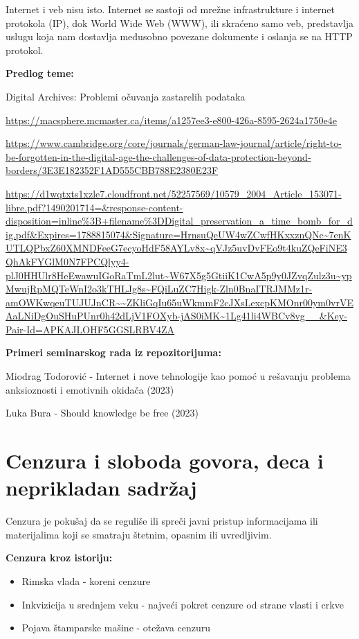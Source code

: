 \documentclass{article}
\begin{document}
Internet i veb nisu isto. Internet se sastoji od mrežne infrastrukture i internet protokola (IP), dok World Wide Web (WWW), ili skraćeno samo veb, predstavlja uslugu koja nam dostavlja međusobno povezane dokumente i oslanja se na HTTP protokol.

\textbf{Predlog teme:}

Digital Archives: Problemi očuvanja zastarelih podataka

\url{https://macsphere.mcmaster.ca/items/a1257ee3-e800-426a-8595-2624a1750e4e}

\url{https://www.cambridge.org/core/journals/german-law-journal/article/right-to-be-forgotten-in-the-digital-age-the-challenges-of-data-protection-beyond-borders/3E3E182352F1AD555CBB788E2380E23F}

\url{https://d1wqtxts1xzle7.cloudfront.net/52257569/10579_2004_Article_153071-libre.pdf?1490201714=&response-content-disposition=inline%3B+filename%3DDigital_preservation_a_time_bomb_for_dig.pdf&Expires=1788815074&Signature=HrnsuQeUW4wZCwfHKxxznQNc~7enKUTLQPbxZ60XMNDFeeG7ecyoHdF58AYLv8x~qVJz5uvDvFEo9t4kuZQeFiNE3QhAkFYGlM0N7FPCQlyy4-plJ0HHUlr8HeEwawuIGoRaTmL2lut~W67X5g5GtiiK1CwA5p9y0JZvqZulz3u~ypMwujRpMQTeWnI2o3kTHLJg8s~FQiLuZC7Higk-Zln0BnaITRJMMz1r-amOWKwqeuTUJUJnCR~~ZKliGqIu65uWkmmF2cJXsLexcpKMOnr00ym0vrVEAaLNiDgOuSHuPUnr0h42dLjV1FOXyb-jAS0iMK~1Lg41li4WBCv8vg__&Key-Pair-Id=APKAJLOHF5GGSLRBV4ZA}

\textbf{Primeri seminarskog rada iz repozitorijuma:}

Miodrag Todorović - Internet i nove tehnologije kao pomoć u rešavanju problema anksioznosti i emotivnih okidača (2023)

Luka Bura - Should knowledge be free (2023)

\section{Cenzura i sloboda govora, deca i neprikladan sadržaj}

Cenzura je pokušaj da se reguliše ili spreči javni pristup informacijama ili materijalima koji se smatraju štetnim, opasnim ili uvredljivim.

\textbf{Cenzura kroz istoriju:}

\begin{itemize}
    \item Rimska vlada - koreni cenzure
    \item Inkvizicija u srednjem veku - najveći pokret cenzure od strane vlasti i crkve
    \item Pojava štamparske mašine - otežava cenzuru
\end{itemize}
\end{document}
